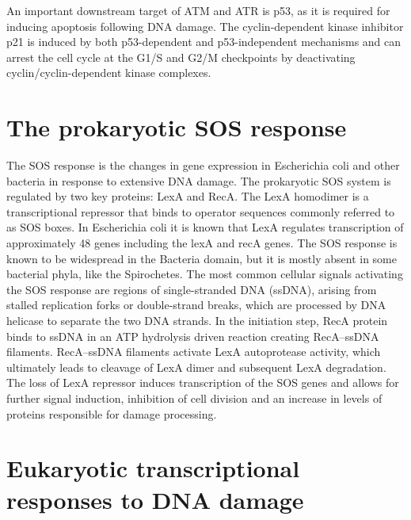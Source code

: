 An important downstream target of ATM and ATR is p53, as it is required for inducing apoptosis following DNA damage. The cyclin-dependent kinase inhibitor p21 is induced by both p53-dependent and p53-independent mechanisms and can arrest the cell cycle at the G1/S and G2/M checkpoints by deactivating cyclin/cyclin-dependent kinase complexes.

\hypertarget{the-prokaryotic-sos-response}{%
\section{The prokaryotic SOS response}\label{the-prokaryotic-sos-response}}

The SOS response is the changes in gene expression in Escherichia coli and other bacteria in response to extensive DNA damage. The prokaryotic SOS system is regulated by two key proteins: LexA and RecA. The LexA homodimer is a transcriptional repressor that binds to operator sequences commonly referred to as SOS boxes. In Escherichia coli it is known that LexA regulates transcription of approximately 48 genes including the lexA and recA genes. The SOS response is known to be widespread in the Bacteria domain, but it is mostly absent in some bacterial phyla, like the Spirochetes. The most common cellular signals activating the SOS response are regions of single-stranded DNA (ssDNA), arising from stalled replication forks or double-strand breaks, which are processed by DNA helicase to separate the two DNA strands. In the initiation step, RecA protein binds to ssDNA in an ATP hydrolysis driven reaction creating RecA--ssDNA filaments. RecA--ssDNA filaments activate LexA autoprotease activity, which ultimately leads to cleavage of LexA dimer and subsequent LexA degradation. The loss of LexA repressor induces transcription of the SOS genes and allows for further signal induction, inhibition of cell division and an increase in levels of proteins responsible for damage processing.

\hypertarget{eukaryotic-transcriptional-responses-to-dna-damage}{%
\section{Eukaryotic transcriptional responses to DNA damage}\label{eukaryotic-transcriptional-responses-to-dna-damage}}

